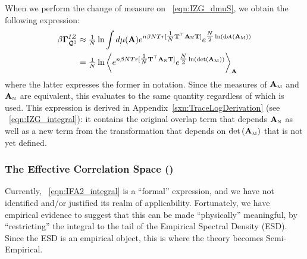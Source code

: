When we perform the change of measure on
\EQN~\ref{eqn:IZG_dmuS},
we obtain the following expression: %
\begin{align}
  \label{eqn:IFA2_integral}
  \nonumber 
  \beta\mathbf{\Gamma}^{IZ}_{\bar{\mathcal{Q}}^{2}} 
  &\approx 
    \tfrac{1}{N}
  \ln \int d\mu(\mathbf{A})
  e^{n\beta N Tr[\tfrac{1}{N}{\mathbf{T}}^{\top}{\mathbf{A}}_{\text{\tiny N}}{\mathbf{T}}] }
  e^{\tfrac{N}{2}\ln(\mbox{}{\text{det}}\left({\mathbf{A}}_{\text{\tiny M}}\right))} \\
  & = 
  \tfrac{1}{N}
  \ln
  \left\langle
  e^{n\beta N Tr[\tfrac{1}{N}{\mathbf{T}}^{\top}{\mathbf{A}}_{\text{\tiny N}}{\mathbf{T}}] }
  e^{\tfrac{N}{2}\ln(\mbox{}{\text{det}}\left({\mathbf{A}}_{\text{\tiny M}}\right))}
    \right\rangle_{\mathbf{A}}
\end{align}
where the latter expresses the former in \BraKet notation. Since the measures of ${\mathbf{A}}_{\text{\tiny M}}$ and ${\mathbf{A}}_{\text{\tiny N}}$ are equivalent, this evaluates to the same quantity regardless of which is used.
This expression is derived in Appendix~\ref{sxn:TraceLogDerivation} (see \EQN~\ref{eqn:IZG_integral}):
it contains the original overlap term that depends ${\mathbf{A}}_{\text{\tiny N}}$ as well as a new term from
the transformation that depends on $\mbox{}{\text{det}}\left({\mathbf{A}}_{\text{\tiny M}}\right)$ that is not yet defined.


\subsubsection{The Effective Correlation Space (\ECS)}

Currently, \EQN~\ref{eqn:IFA2_integral} is a ``formal'' expression, 
and we have not identified and/or justified its realm of applicability.
Fortunately, we have empirical evidence to suggest that this can be
made ``physically'' meaningful, by ``restricting'' the integral
to the tail of the Empirical Spectral Density (ESD). Since the ESD is an empirical object, this is where the theory becomes Semi-Empirical.


